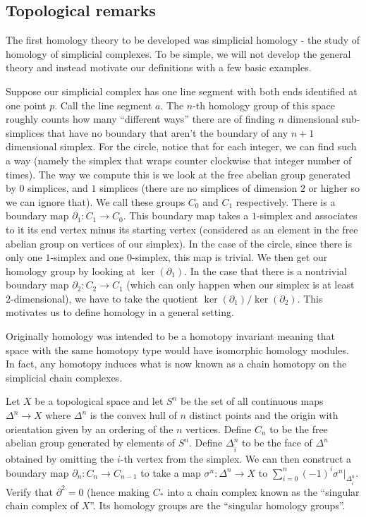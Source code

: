 \subsection{Topological remarks}

The first homology theory
to be developed was simplicial homology - the study of homology
of simplicial
complexes. To be simple, we will not develop the general theory
and instead
motivate our definitions with a few basic examples.

\begin{example} Suppose
our simplicial complex has one line segment with both ends
identified at
one point $p$. Call the line segment $a$. The $n$-th homology
group of this
space roughly counts how many ``different ways'' there are of
finding $n$
dimensional sub-simplices that have no boundary that aren't the
boundary of
any $n+1$ dimensional simplex. For the circle, notice that for
each integer,
we can find such a way (namely the simplex that wraps counter
clockwise that
integer number of times). The way we compute this is we look at
the free abelian group generated by $0$ simplices, and $1$
simplices (there are no simplices of
dimension $2$ or higher so we can ignore that). We call these
groups $C_0$ and
$C_1$ respectively. There is a boundary map $\partial_1:
C_1\rightarrow C_0$.
This boundary map takes a $1$-simplex and associates to it its
end vertex minus
its starting vertex (considered as an element in the free
abelian group on
vertices of our simplex). In the case of the circle, since there
is only one
$1$-simplex and one $0$-simplex, this map is trivial. We then
get our homology
group by looking at $\ker(\partial_1)$. In the case that there
is a nontrivial
boundary map $\partial_2: C_2\rightarrow C_1$ (which can only
happen when our
simplex is at least $2$-dimensional), we have to take the
quotient
$\ker(\partial_1)/\ker(\partial_2)$. This motivates us to define
homology in a
general setting.
\end{example}

Originally homology was
intended to be a homotopy invariant meaning that space with the
same homotopy type would have isomorphic homology modules. In fact, any
homotopy induces what is now known as a chain homotopy on the simplicial chain
complexes.

\begin{exercise} Let $X$ be a topological
space and let $S^n$ be the set of all continuous maps
$\Delta^n\rightarrow X$ where $\Delta^n$ is the convex hull of
$n$ distinct points and the origin with orientation given by an
ordering of the $n$ vertices. Define $C_n$ to be the free
abelian group generated by elements of $S^n$. Define
$\Delta^n_{\hat{i}}$ to be the face of $\Delta^n$ obtained by
omitting the $i$-th vertex from the simplex. We can then
construct a boundary map $\partial_n:C_n\rightarrow C_{n-1}$ to
take a map $\sigma^n:\Delta^n\rightarrow X$ to
$\sum_{i=0}^n(-1)^i\sigma^n|_{\Delta^n_{\hat{i}}}$. Verify that
$\partial^2=0$ (hence making $C_*$ into a chain complex known as
the ``singular chain complex of $X$''. Its homology groups are
the ``singular homology groups''. \end{exercise}

